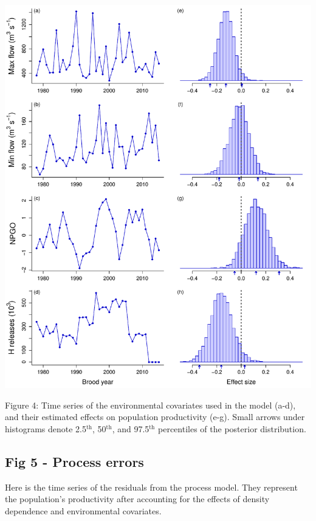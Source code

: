 \documentclass[
  11pt,
]{article}
\begin{document}
\begin{center}\includegraphics{App_3_Summarize_results_files/figure-latex/fig_4_cov_effects-1} \end{center}

Figure 4: Time series of the environmental covariates used in the model
(a-d), and their estimated effects on population productivity (e-g).
Small arrows under histograms denote 2.5\(^\text{th}\),
50\(^\text{th}\), and 97.5\(^\text{th}\) percentiles of the posterior
distribution.

\hypertarget{fig-5---process-errors}{%
\subsection{Fig 5 - Process errors}\label{fig-5---process-errors}}

Here is the time series of the residuals from the process model. They
represent the population's productivity after accounting for the effects
of density dependence and environmental covariates.
\end{document}
